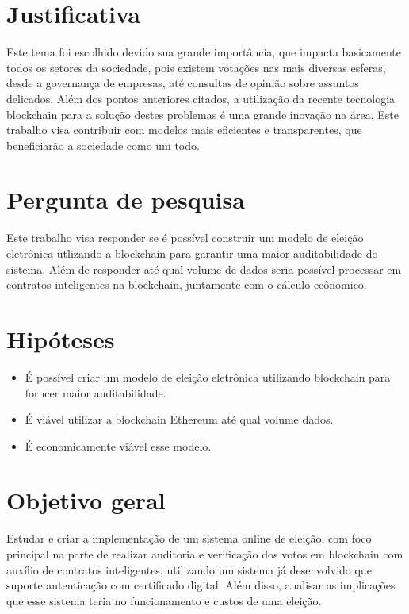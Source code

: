 \documentclass{ufsctex/ufsctex}
\begin{document}
\section{Justificativa}

Este tema foi escolhido devido sua grande importância, que impacta basicamente
todos os setores da sociedade, pois existem votações nas mais diversas esferas,
desde a governança de empresas, até consultas de opinião sobre assuntos delicados.
Além dos pontos anteriores citados, a utilização da recente tecnologia blockchain
para a solução destes problemas é uma grande inovação na área. Este trabalho visa
contribuir com modelos mais eficientes e transparentes, que beneficiarão a sociedade
como um todo.

\section{Pergunta de pesquisa}

Este trabalho visa responder se é possível construir um modelo de eleição
eletrônica utlizando a blockchain para garantir uma maior auditabilidade
do sistema. Além de responder até qual volume de dados seria possível processar
em contratos inteligentes na blockchain, juntamente com o cálculo ecônomico.

\section{Hipóteses}

\begin{itemize}
	\item É possível criar um modelo de eleição eletrônica utilizando blockchain
		para forncer maior auditabilidade.
	\item É viável utilizar a blockchain Ethereum até qual volume dados.
	\item É economicamente viável esse modelo.
\end{itemize}

\section{Objetivo geral}

Estudar e criar a implementação de um sistema online de eleição, com foco
principal na parte de realizar auditoria e verificação dos votos em blockchain
com auxílio de contratos inteligentes, utilizando um sistema já desenvolvido
que suporte autenticação com certificado digital. Além disso, analisar as implicações
que esse sistema teria no funcionamento e custos de uma eleição. \\
\end{document}
